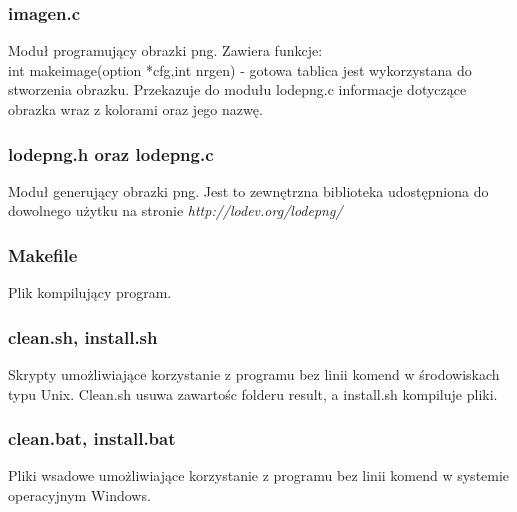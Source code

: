 \documentclass{article}
\begin{document}
\subsubsection*{imagen.c}
Moduł programujący obrazki png. Zawiera funkcje:\\
int makeimage(option *cfg,int nrgen) - gotowa tablica jest wykorzystana do stworzenia obrazku. Przekazuje do modułu lodepng.c informacje dotyczące obrazka wraz z kolorami oraz jego nazwę.
\subsubsection*{lodepng.h oraz lodepng.c}
Moduł generujący obrazki png. Jest to zewnętrzna biblioteka udostępniona do dowolnego użytku na stronie\emph{ http://lodev.org/lodepng/}
\subsubsection*{Makefile}
Plik kompilujący program.
\subsubsection*{clean.sh, install.sh}
Skrypty umożliwiające korzystanie z programu bez linii komend w środowiskach typu Unix. Clean.sh usuwa zawartośc folderu result, a install.sh kompiluje pliki.
\subsubsection*{clean.bat, install.bat}
Pliki wsadowe umożliwiające korzystanie z programu bez linii komend w systemie operacyjnym Windows.

  
\end{document}
